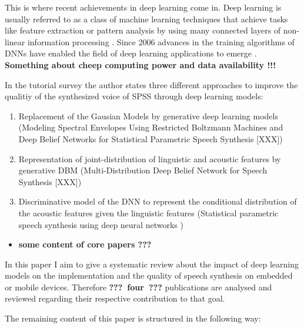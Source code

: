 This is where recent achievements in deep learning come in. Deep learning is usually referred to as a class of machine learning techniques that achieve tasks like feature extraction or pattern analysis by using many connected layers of non-linear information processing \cite{ling:deep, li:survey}. Since 2006 advances in the training algorithms of \acp{DNN} have enabled the field of deep learning applications to emerge \cite{boros:robust}. \textbf{Something about cheep computing power and data availability !!!}

In the tutorial survey \cite{li:survey} the author states three different approaches to improve the qualitiy of the synthesized voice of \ac{SPSS} through deep learning models:

\vspace{1em}

\begin{enumerate}[leftmargin=16pt]
	\parskip0.5em
	\item Replacement of the Gausian Models by generative deep learning models (Modeling Spectral Envelopes Using Restricted Boltzmann Machines and Deep Belief Networks for Statistical Parametric Speech Synthesis [XXX])
	\item Representation of joint-distribution of linguistic and acoustic features by generative DBM (Multi-Distribution Deep Belief Network for Speech Synthesis [XXX])
	\item Discriminative model of the DNN to represent the conditional distribution of the acoustic features given the linguistic features (Statistical parametric speech synthesis using deep neural networks \cite{zen:deepstatistical})
\end{enumerate}

\vspace{1em}

\begin{itemize}[leftmargin=10pt]
	\item \textbf{some content of core papers ???}
\end{itemize}

\vspace{1em}

In this paper I aim to give a systematic review about the impact of deep learning models on the implementation and the quality of speech synthesis on embedded or mobile devices. Therefore \textbf{???~four~???} publications are analysed and reviewed regarding their respective contribution to that goal.

The remaining content of this paper is structured in the following way:

